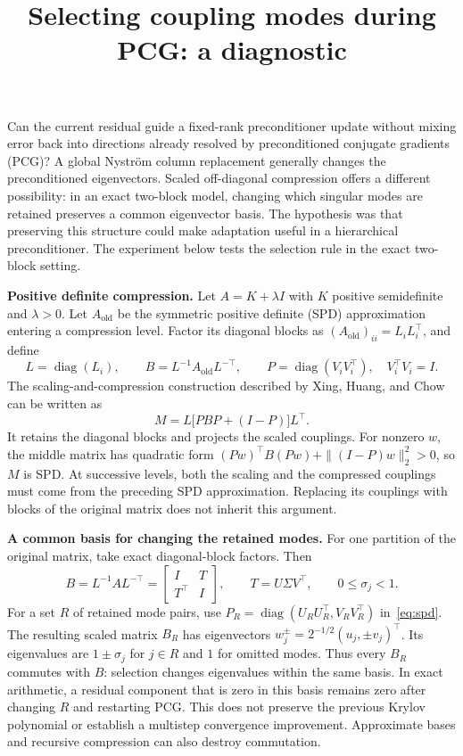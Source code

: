\documentclass[10pt]{article}
\title{Selecting coupling modes during PCG: a diagnostic}
\author{}
\date{}
\begin{document}
\maketitle
\vspace{-2em}

Can the current residual guide a fixed-rank preconditioner update without
mixing error back into directions already resolved by preconditioned conjugate
gradients (PCG)? A global
Nystr\"om column replacement generally changes the preconditioned eigenvectors.
Scaled off-diagonal compression offers a different possibility: in an exact
two-block model, changing which singular modes are retained preserves a common
eigenvector basis. The hypothesis was that preserving this structure could make
adaptation useful in a hierarchical preconditioner. The experiment below tests
the selection rule in the exact two-block setting.

\textbf{Positive definite compression.}
Let $A=K+\lambda I$ with $K$ positive semidefinite and $\lambda>0$.
Let $A_{\mathrm{old}}$ be the symmetric positive definite (SPD) approximation
entering a compression level. Factor its diagonal blocks as
$(A_{\mathrm{old}})_{ii}=L_iL_i^\top$, and define
\[
  L=\operatorname{diag}(L_i),\qquad
  B=L^{-1}A_{\mathrm{old}}L^{-\top},\qquad
  P=\operatorname{diag}(V_iV_i^\top),\quad V_i^\top V_i=I.
\]
The scaling-and-compression construction described by Xing, Huang, and
Chow~\cite{xing2021} can be written as
\begin{equation}
  M=L\bigl[PBP+(I-P)\bigr]L^\top.                 \label{eq:spd}
\end{equation}
It retains the diagonal blocks and projects the scaled couplings. For nonzero
$w$, the middle matrix has quadratic form
$(Pw)^\top B(Pw)+\|(I-P)w\|_2^2>0$, so $M$ is SPD.
At successive levels, both the scaling and the compressed couplings must come
from the preceding SPD approximation. Replacing its couplings with blocks of
the original matrix does not inherit this argument.

\textbf{A common basis for changing the retained modes.}
For one partition of the original matrix, take exact diagonal-block factors.
Then
\[
 B=L^{-1}AL^{-\top}=
 \begin{bmatrix}I&T\\T^\top&I\end{bmatrix},\qquad
 T=U\Sigma V^\top,\qquad 0\leq\sigma_j<1.
\]
For a set $R$ of retained mode pairs, use
$P_R=\operatorname{diag}(U_RU_R^\top,V_RV_R^\top)$ in~\eqref{eq:spd}.
The resulting scaled matrix $B_R$ has eigenvectors
$w_j^{\pm}=2^{-1/2}(u_j,\pm v_j)^\top$.
Its eigenvalues are $1\pm\sigma_j$ for $j\in R$ and $1$ for omitted modes.
Thus every $B_R$ commutes with $B$: selection changes eigenvalues within the
same basis. In exact arithmetic, a residual component that is zero in this
basis remains zero after changing $R$ and restarting PCG. This does not preserve
the previous Krylov polynomial or establish a multistep convergence improvement.
Approximate bases and recursive compression can also destroy commutation.
\end{document}
